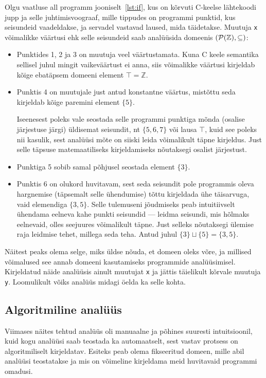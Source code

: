 \documentclass[../thesis.tex]{subfiles}
\begin{document}
Olgu vaatluse all programm jooniselt~\ref{lst:if}, kus on kõrvuti C-keelse lähtekoodi jupp ja selle juhtimisvoograaf, mille tippudes on programmi punktid, kus seisundeid vaadeldakse, ja servadel vastavad laused, mida täidetakse. Muutuja \texttt{x} võimalikke väärtusi ehk selle seisundeid saab analüüsida domeenis $(\mathcal{P}(\mathbb{Z}), \subseteq)$:
\begin{itemize}
	\item Punktides 1, 2 ja 3 on muutuja veel väärtustamata. Kuna C keele semantika sellisel juhul mingit vaikeväärtust ei anna, siis võimalikke väärtusi kirjeldab kõige ebatäpsem domeeni element $\top = \mathbb{Z}$.
	\item Punktis 4 on muutujale just antud konstantne väärtus, mistõttu seda kirjeldab kõige paremini element $\{5\}$.

		Iseenesest poleks vale seostada selle programmi punktiga mõnda (osalise järjestuse järgi) üldisemat seisundit, nt $\{5, 6, 7\}$ või lausa $\top$, kuid see poleks nii kasulik, sest analüüsi mõte on siiski leida võimalikult täpne kirjeldus. Just selle täpsuse matemaatiliseks kirjeldamiseks nõutaksegi osalist järjestust.
	\item Punktiga 5 sobib samal põhjusel seostada element $\{3\}$.
	\item Punktis 6 on olukord huvitavam, sest seda seisundit pole programmis oleva hargnemise (täpsemalt selle ühendumise) tõttu kirjeldada ühe täisarvuga, vaid elemendiga $\{3, 5\}$. Selle tulemuseni jõudmiseks peab intuitiivselt ühendama eelneva kahe punkti seisundid --- leidma seisundi, mis hõlmaks eelnevaid, olles seejuures võimalikult täpne. Just selleks nõutaksegi ülemise raja leidmise tehet, millega seda teha. Antud juhul $\{3\} \sqcup \{5\} = \{3, 5\}$.
\end{itemize}

Näitest peaks olema selge, miks üldse nõuda, et domeen oleks võre, ja millised võimalused see annab domeeni kasutamiseks programmide analüüsimisel. Kirjeldatud näide analüüsis ainult muutujat \texttt{x} ja jättis täielikult kõrvale muutuja \texttt{y}. Loomulikult võiks analüüs midagi öelda ka selle kohta.


\subsection{Algoritmiline analüüs}
Viimases näites tehtud analüüs oli manuaalne ja põhines suuresti intuitsioonil, kuid kogu analüüsi saab teostada ka automaatselt, sest vastav protsess on algoritmiliselt kirjeldatav. Esiteks peab olema fikseeritud domeen, mille abil analüüsi teostatakse ja mis on võimeline kirjeldama meid huvitavaid programmi omadusi.
\end{document}
